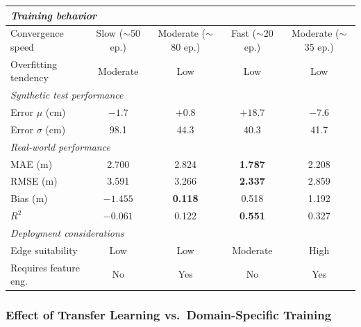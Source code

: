 \begin{table}[htbp]
\begin{center}
\begin{tabular}{|l|c|c|c|c|}
        \multicolumn{5}{|l|}{\textit{Training behavior}} \\
        \hline
        Convergence speed
            & Slow ($\sim$50 ep.)
            & Moderate ($\sim$80 ep.)
            & Fast ($\sim$20 ep.)
            & Moderate ($\sim$35 ep.) \\
        Overfitting tendency
            & Moderate
            & Low
            & Low
            & Low \\
        \hline
        \multicolumn{5}{|l|}{\textit{Synthetic test performance}} \\
        \hline
        Error $\mu$ (cm)
            & $-1.7$
            & $+0.8$
            & $+18.7$
            & $-7.6$ \\
        Error $\sigma$ (cm)
            & 98.1
            & 44.3
            & 40.3
            & 41.7 \\
        \hline
        \multicolumn{5}{|l|}{\textit{Real-world performance}} \\
        \hline
        MAE (m)
            & 2.700
            & 2.824
            & \textbf{1.787}
            & 2.208 \\
        RMSE (m)
            & 3.591
            & 3.266
            & \textbf{2.337}
            & 2.859 \\
        Bias (m)
            & $-1.455$
            & \textbf{0.118}
            & 0.518
            & 1.192 \\
        $R^2$
            & $-0.061$
            & 0.122
            & \textbf{0.551}
            & 0.327 \\
        \hline
        \multicolumn{5}{|l|}{\textit{Deployment considerations}} \\
        \hline
        Edge suitability
            & Low
            & Low
            & Moderate
            & High \\
        Requires feature eng.
            & No
            & Yes
            & No
            & Yes \\
        \hline
        \end{tabular}
    \label{tab:model_comparison}
    \end{center}
\end{table}

\subsubsection{Effect of Transfer Learning vs.\ Domain-Specific Training}

